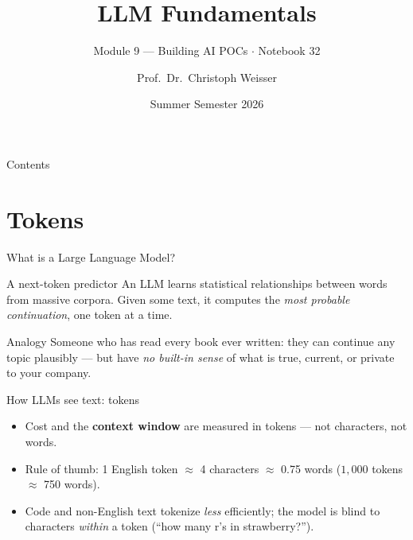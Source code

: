 \documentclass[aspectratio=169,11pt]{beamer}
\title{LLM Fundamentals}
\subtitle{Module 9 --- Building AI POCs $\cdot$ Notebook 32}
\author{Prof.\ Dr.\ Christoph Weisser}
\institute{HSBI}
\date{Summer Semester 2026}
\begin{document}
\begin{frame}\titlepage\end{frame}

\begin{frame}{Contents}
  \tableofcontents[hideallsubsections]
\end{frame}

\section{Tokens}
\begin{frame}{What is a Large Language Model?}
  \begin{block}{A next-token predictor}
    An LLM learns statistical relationships between words from massive corpora. Given some text, it computes the \emph{most probable continuation}, one token at a time.
  \end{block}
  \begin{exampleblock}{Analogy}
    Someone who has read every book ever written: they can continue any topic plausibly --- but have \emph{no built-in sense} of what is true, current, or private to your company.
  \end{exampleblock}
\end{frame}

\begin{frame}{How LLMs see text: tokens}
  \begin{center}
  \end{center}
  \begin{itemize}
    \item Cost and the \textbf{context window} are measured in tokens --- not characters, not words.
    \item Rule of thumb: 1 English token $\approx$ 4 characters $\approx$ 0.75 words ($1{,}000$ tokens $\approx$ 750 words).
    \item Code and non-English text tokenize \emph{less} efficiently; the model is blind to characters \emph{within} a token (``how many r's in strawberry?'').
  \end{itemize}
\end{frame}
\end{document}
